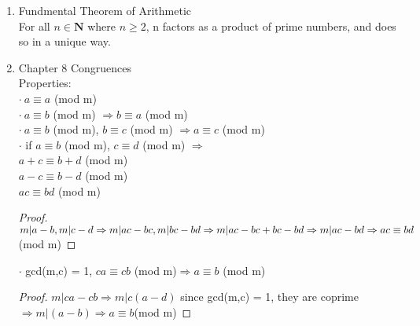 \documentclass[10pt]{article}
\newcommand{\Nb}{\mathbf{N}}
\begin{document}
\begin{multicols}{2}
\begin{enumerate}
	Thm1: gcd(m,n) = 1, $m|nc\Rightarrow m|c$
	\begin{proof}
		$\exists x_0,y_0$ s.t. $mx_0+ny_0 = 1$\\
		Then $mx_0c + ny_0c = c$\\
		$m|nc \Rightarrow m|(mx_0c + ny_0c)\Rightarrow m|c$
	\end{proof}
	Thm2: suppose p is prime, $p|ab \Rightarrow p|a$ or $p|b$
	\begin{proof}
		if $p|a$, this is true.
		if $p\nmid a$, then gcd(p,a) = 1 since p is prime.\\
		Then $p|ab \Rightarrow p|b$
	\end{proof}
	Thm3: all solutions to $ax + by = gcd(a,b)$\\
	we can find $ax_0 + by_0 = gcd(a,b)$ by Euclidean algorithm.\\
	Then we have $ax+by = ax_0 + by_0 = gcd(a,b)$\\
	Then $a(x_0-x) + b(y_0-y) = 0\Rightarrow a(x_0 - x) = b(y-y_0)$\\
	Divides both sides by gcd(a,b)\\
	$\frac{a(x_0-x)}{gcd(a,b)} = \frac{b(y-y_0)}{gcd(a,b)}$\\
	$\Rightarrow \frac{a}{gcd(a,b)}|\frac{b}{gcd(a,b)}\cdot (y-y_0)$\\
	 since $\frac{a}{gcd(a,b)},\frac{b}{gcd(a,b)}$ are co-prime $\Rightarrow \frac{a}{gcd(a,b)} | y-y_0$\\
	 $y = y_0 + k \frac{a}{gcd(a,b)}$\\
	 similarly, $x = x_0 - q \frac{b}{gcd(a,b)}$, where k are the same.
	
	\item Fundmental Theorem of Arithmetic\\
	For all $n \in \Nb$ where $n \ge 2$, n factors as a product of prime numbers, and does so in a unique way.

	\item Chapter 8 Congruences\\
	Properties:\\
	$\cdot \ a \equiv a$ (mod m)\\
	$\cdot \ a \equiv b$ (mod m) $\Rightarrow b \equiv a$ (mod m)\\
	$\cdot \ a \equiv b$ (mod m),  $b \equiv c$ (mod m) $\Rightarrow a \equiv c$ (mod m)\\
	$\cdot$ if $a \equiv b$ (mod m),  $c \equiv d$ (mod m) $\Rightarrow$\\
	$a+c \equiv b+d$ (mod m)\\
	$a-c \equiv b-d$ (mod m)\\
	$ac \equiv bd$ (mod m)
	\begin{proof}
		$m|a-b, m|c-d \Rightarrow m|ac-bc, m|bc-bd\Rightarrow\\ m|ac-bc+bc-bd \Rightarrow m|ac-bd\Rightarrow ac\equiv bd$(mod m)
	\end{proof}
	$\cdot$ gcd(m,c) = 1, $ca \equiv cb$ (mod m)$\Rightarrow a \equiv b$ (mod m) 
	\begin{proof}
		$m|ca-cb\Rightarrow m|c(a-d)$ since gcd(m,c) = 1, they are coprime$\Rightarrow m|(a-b)\Rightarrow a\equiv b$(mod m)
	\end{proof}
		

\end{enumerate}
\end{multicols}
\end{document}
